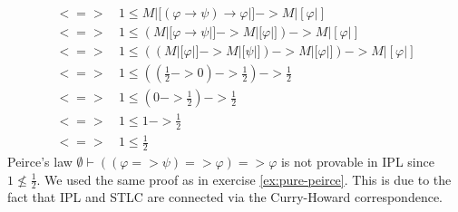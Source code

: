 \begin{answer}
\begin{itemize}
\begin{align*}
                <=>\, & 1 \le M|[(\varphi \to \psi) \to \varphi|] -> M|[\varphi|] \\
                <=>\, & 1 \le (M|[\varphi \to \psi|] -> M|[\varphi|]) -> M|[\varphi|] \\
                <=>\, & 1 \le ((M|[\varphi|] -> M|[\psi|]) -> M|[\varphi|]) -> M|[\varphi|] \\
                <=>\, & 1 \le ((\frac{1}{2} -> 0) -> \frac{1}{2}) -> \frac{1}{2} \\
                <=>\, & 1 \le (0 -> \frac{1}{2}) -> \frac{1}{2} \\
                <=>\, & 1 \le 1 -> \frac{1}{2} \\
                <=>\, & 1 \le \frac{1}{2}
            \end{align*}
            Peirce's law $\emptyset \vdash ((\varphi => \psi) => \varphi) => \varphi$ is not provable in IPL since $1 \nleq \frac{1}{2}$.
            We used the same proof as in exercise \ref{ex:pure-peirce}.
            This is due to the fact that IPL and STLC are connected via the Curry-Howard correspondence.
    \end{itemize}
\end{answer}



